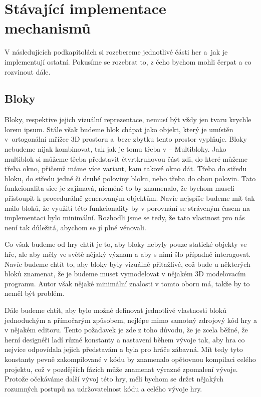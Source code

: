 

\section{Stávající implementace mechanismů}

V následujících podkapitolách si rozebereme jednotlivé části her a~jak je implementují ostatní. Pokusíme se rozebrat to, z čeho bychom mohli čerpat a co rozvinout dále.

\subsection{Bloky}
Bloky, respektive jejich vizuální reprezentace, nemusí být vždy jen tvaru krychle lorem ipsum. Stále však budeme blok chápat jako objekt, který je umístěn v~ortogonální mřížce 3D prostoru a~beze zbytku tento prostor vyplňuje. Bloky nebudeme nijak kombinovat, tak jak je tomu třeba v \ME{} -- Multibloky. Jako multiblok si můžeme třeba představit čtvrtkruhovou část zdi, do které můžeme  třeba okno, přičemž máme více variant, kam takové okno dát. Třeba do středu bloku, do středu jedné či druhé poloviny bloku, nebo třeba do obou polovin. Tato funkcionalita sice je zajímavá, nicméně to by znamenalo, že bychom museli přistoupit k procedurálně generovaným objektům. Navíc nejspíše budeme mít tak málo bloků, že využití této funkcionality by v porovnání se stráveným časem na implementaci bylo minimální. Rozhodli jsme se tedy, že tato vlastnost pro nás není tak důležitá, abychom se jí plně věnovali. 

Co však budeme od hry chtít je to, aby bloky nebyly pouze statické objekty ve hře, ale aby měly ve světě nějaký význam a aby s nimi šlo případně interagovat. Navíc budeme chtít to, aby bloky byly vizuálně přitažlivé, což bude u některých bloků znamenat, že je budeme muset vymodelovat v nějakém 3D modelovacím programu. Autor však nějaké minimální znalosti v tomto oboru má, takže by to neměl být problém.

Dále budeme chtít, aby bylo možné definovat jednotlivé vlastnosti bloků jednoduchým a přímočarým způsobem, nejlépe mimo samotný zdrojový kód hry a v nějakém editoru. Tento požadavek je zde z toho důvodu, že je zcela běžné, že herní designéři ladí různé konstanty a nastavení během vývoje tak, aby hra co nejvíce odpovídala jejich představám a byla pro hráče zábavná. Mít tedy tyto konstanty pevně zakompilované v kódu by znamenalo opětovnou kompilaci celého projektu, což v pozdějších fázích může znamenat výrazné zpomalení vývoje. Protože očekáváme další vývoj této hry, měli bychom se držet nějakých rozumných postupů na udržovatelnost kódu a celého vývoje hry.

